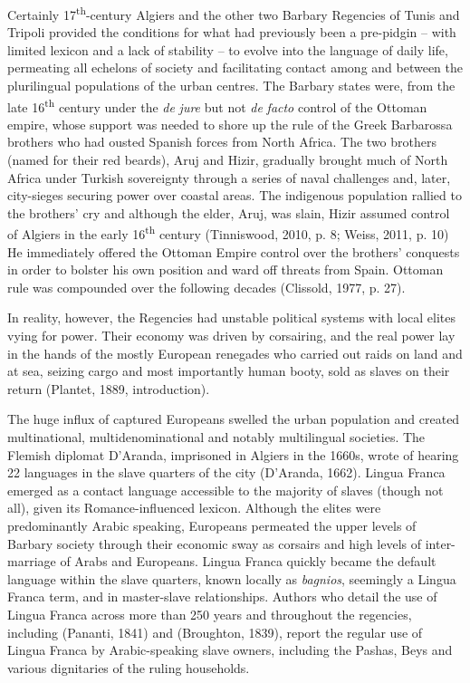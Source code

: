 \documentclass[output=paper]{langsci/langscibook}
\begin{document}
Certainly 17\textsuperscript{th}{}-century Algiers and the other two Barbary Regencies of Tunis and Tripoli provided the conditions for what had previously been a pre-pidgin – with limited lexicon and a lack of stability – to evolve into the language of daily life, permeating all echelons of society and facilitating contact among and between the plurilingual populations of the urban centres. The Barbary states were, from the late 16\textsuperscript{th} century under the \textit{de} \textit{jure} but not \textit{de} \textit{facto} control of the Ottoman empire, whose support was needed to shore up the rule of the Greek Barbarossa brothers who had ousted Spanish forces from North Africa. The two brothers (named for their red beards), Aruj and Hizir, gradually brought much of North Africa under Turkish sovereignty through a series of naval challenges and, later, city-sieges securing power over coastal areas. The indigenous population rallied to the brothers’ cry and although the elder, Aruj, was slain, Hizir assumed control of Algiers in the early 16\textsuperscript{th} century (Tinniswood, 2010, p. 8; Weiss, 2011, p. 10) He immediately offered the Ottoman Empire control over the brothers’ conquests in order to bolster his own position and ward off threats from Spain. Ottoman rule was compounded over the following decades (Clissold, 1977, p. 27). 

In reality, however, the Regencies had unstable political systems with local elites vying for power. Their economy was driven by corsairing, and the real power lay in the hands of the mostly European renegades who carried out raids on land and at sea, seizing cargo and most importantly human booty, sold as slaves on their return (Plantet, 1889, introduction).

The huge influx of captured Europeans swelled the urban population and created multinational, multidenominational and notably multilingual societies. The Flemish diplomat D’Aranda, imprisoned in Algiers in the 1660s, wrote of hearing 22 languages in the slave quarters of the city (D’Aranda, 1662). Lingua Franca emerged as a contact language accessible to the majority of slaves (though not all), given its Romance-influenced lexicon. Although the elites were predominantly Arabic speaking, Europeans permeated the upper levels of Barbary society through their economic sway as corsairs and high levels of inter-marriage of Arabs and Europeans. Lingua Franca quickly became the default language within the slave quarters, known locally as \textit{bagnios}, seemingly a Lingua Franca term, and in master-slave relationships. Authors who detail the use of Lingua Franca across more than 250 years and throughout the regencies, including (Pananti, 1841) and (Broughton, 1839), report the regular use of Lingua Franca by Arabic-speaking slave owners, including the Pashas, Beys and various dignitaries of the ruling households. 
\end{document}
